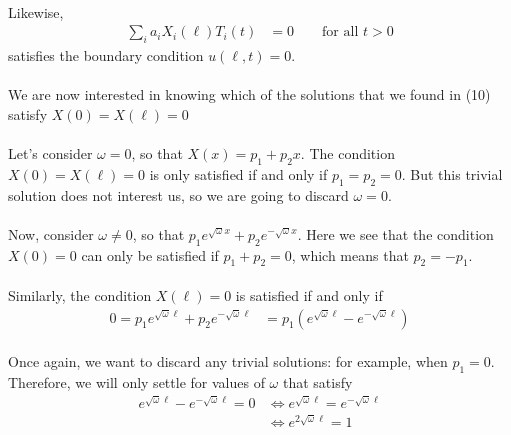 \documentclass[letter]{article}
\begin{document}
    \paragraph{}Likewise, 
    \begin{equation}
        \begin{split}
            \sum_i a_i X_i(\ell)T_i(t) &= 0 \qquad \text{for all } t>0
        \end{split}
    \end{equation}
    satisfies the boundary condition $u(\ell,t)=0$.
    \paragraph{}We are now interested in knowing which of the solutions that we found in (10) satisfy $X(0)=X(\ell)=0$
    \paragraph{}Let's consider $\omega=0$, so that $X(x)=p_1+p_2x$. The condition $X(0)=X(\ell)=0$ is only satisfied if and only if $p_1=p_2=0$. But this trivial solution does not interest us, so we are going to discard $\omega=0$.
    \paragraph{} Now, consider $\omega \neq 0$, so that $p_1e^{\sqrt{\omega}x}+p_2e^{-\sqrt{\omega}x}$. Here we see that the condition $X(0)=0$ can only be satisfied if $p_1+p_2=0$, which means that $p_2=-p_1$.
    \paragraph{}Similarly, the condition $X(\ell)=0$ is satisfied if and only if
    \begin{equation}
        \begin{split}
            0=p_1e^{\sqrt{\omega}\ell}+p_2 e^{-\sqrt{\omega}\ell} 
            &= p_1(e^{\sqrt{\omega}\ell}-e^{-\sqrt{\omega}\ell})
        \end{split}
    \end{equation}
    \paragraph{}Once again, we want to discard any trivial solutions: for example, when $p_1=0$. Therefore, we will only settle for values of $\omega$ that satisfy
    \begin{equation}
        \begin{split}
            e^{\sqrt{\omega}\ell}-e^{-\sqrt{\omega}\ell} 
            = 0 &\Longleftrightarrow e^{\sqrt{\omega}\ell}=e^{-\sqrt{\omega}\ell}\\
            &\Longleftrightarrow e^{2\sqrt{\omega}\ell}=1
        \end{split}
    \end{equation}
\end{document}
